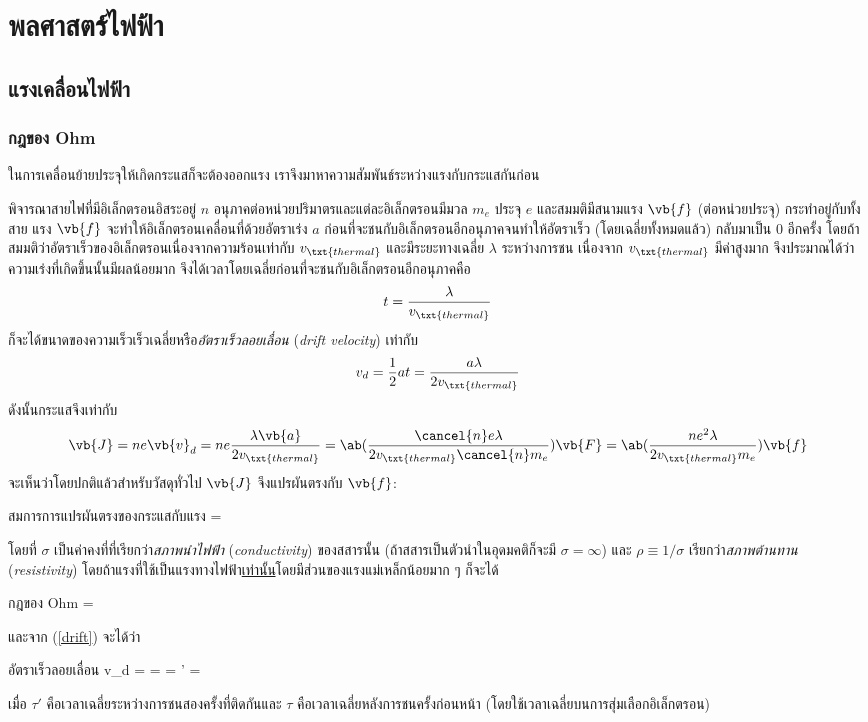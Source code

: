 \chapter{พลศาสตร์ไฟฟ้า}
\section{แรงเคลื่อนไฟฟ้า}
\subsection{กฎของ Ohm}

ในการเคลื่อนย้ายประจุให้เกิดกระแสก็จะต้องออกแรง เราจึงมาหาความสัมพันธ์ระหว่างแรงกับกระแสกันก่อน

พิจารณาสายไฟที่มีอิเล็กตรอนอิสระอยู่ $n$ อนุภาคต่อหน่วยปริมาตรและแต่ละอิเล็กตรอนมีมวล $m_e$ ประจุ $e$ และสมมติมีสนามแรง $\vb{f}$ (ต่อหน่วยประจุ) กระทำอยู่กับทั้งสาย แรง $\vb{f}$ จะทำให้อิเล็กตรอนเคลื่อนที่ด้วยอัตราเร่ง $a$ ก่อนที่จะชนกับอิเล็กตรอนอีกอนุภาคจนทำให้อัตราเร็ว (โดยเฉลี่ยทั้งหมดแล้ว) กลับมาเป็น $0$ อีกครั้ง โดยถ้าสมมติว่าอัตราเร็วของอิเล็กตรอนเนื่องจากความร้อนเท่ากับ $v_\txt{thermal}$ และมีระยะทางเฉลี่ย $\lambda$ ระหว่างการชน เนื่องจาก $v_\txt{thermal}$ มีค่าสูงมาก จึงประมาณได้ว่าความเร่งที่เกิดขึ้นนั้นมีผลน้อยมาก จึงได้เวลาโดยเฉลี่ยก่อนที่จะชนกับอิเล็กตรอนอีกอนุภาคคือ
\[ 
t = \frac{\lambda}{v_\txt{thermal}} 
\]
ก็จะได้ขนาดของความเร็วเร็วเฉลี่ยหรือ\emph{อัตราเร็วลอยเลื่อน} (\emph{drift velocity}) เท่ากับ
\begin{equation}
    v_d = \frac{1}{2}at = \frac{a\lambda}{2v_\txt{thermal}}\label{drift}
\end{equation}
ดังนั้นกระแสจึงเท่ากับ
\begin{equation} 
    \vb{J} = ne\vb{v}_d = ne\frac{\lambda\vb{a}}{2v_\txt{thermal}} = \ab(\frac{\cancel{n}e\lambda}{2v_\txt{thermal}\cancel{n}m_e})\vb{F} = \ab(\frac{ne^2\lambda}{2v_\txt{thermal}m_e})\vb{f}\label{ohmapprox} 
\end{equation}
จะเห็นว่าโดยปกติแล้วสำหรับวัสดุทั่วไป $\vb{J}$ จึงแปรผันตรงกับ $\vb{f}$:
\begin{eqbox}{สมการการแปรผันตรงของกระแสกับแรง} 
     = \sigma{} 
\end{eqbox}
โดยที่ $\sigma$ เป็นค่าคงที่ที่เรียกว่า\emph{สภาพนำไฟฟ้า} (\emph{conductivity}) ของสสารนั้น (ถ้าสสารเป็นตัวนำในอุดมคติก็จะมี $\sigma = \infty$) และ $\rho\equiv 1/\sigma$ เรียกว่า\emph{สภาพต้านทาน} (\emph{resistivity}) โดยถ้าแรงที่ใช้เป็นแรงทางไฟฟ้า\underline{เท่านั้น}โดยมีส่วนของแรงแม่เหล็กน้อยมาก ๆ ก็จะได้
\begin{ieqbox}{กฎของ Ohm} 
     = \sigma{}\label{ohme} 
\end{ieqbox}
และจาก (\ref{drift}) จะได้ว่า
\begin{eqbox}{อัตราเร็วลอยเลื่อน}
    v_d =  = \lambda = \tau' = \tau\label{drifte}
\end{eqbox}
เมื่อ $\tau'$ คือเวลาเฉลี่ยระหว่างการชนสองครั้งที่ติดกันและ $\tau$ คือเวลาเฉลี่ยหลังการชนครั้งก่อนหน้า (โดยใช้เวลาเฉลี่ยบนการสุ่มเลือกอิเล็กตรอน)

